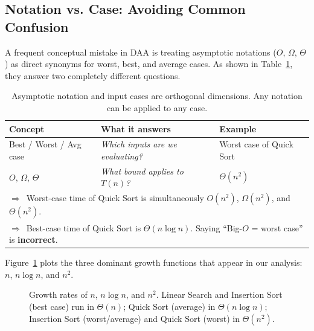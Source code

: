 \documentclass[11pt,a4paper]{article}
\begin{document}
\subsection{Notation vs. Case: Avoiding Common Confusion}
A frequent conceptual mistake in DAA is treating asymptotic notations ($O$, $\Omega$,
$\Theta$) as direct synonyms for worst, best, and average cases. As shown in
Table~\ref{tab:notation}, they answer two completely different questions.

\begin{table}[h]
\centering
\begin{tabular}{@{}lll@{}}
\toprule
\textbf{Concept}         & \textbf{What it answers}              & \textbf{Example} \\
\midrule
Best / Worst / Avg case  & \emph{Which inputs are we evaluating?}& Worst case of Quick Sort \\
$O$, $\Omega$, $\Theta$  & \emph{What bound applies to $T(n)$?}  & $\Theta(n^2)$ \\
\midrule
\multicolumn{3}{l}{\footnotesize $\Rightarrow$~Worst-case time of Quick Sort is simultaneously $O(n^2)$, $\Omega(n^2)$,
and $\Theta(n^2)$.}\\
\multicolumn{3}{l}{\footnotesize $\Rightarrow$~Best-case time of Quick Sort is $\Theta(n\log n)$.
Saying ``Big-$O$ = worst case'' is \textbf{incorrect}.}\\
\bottomrule
\end{tabular}
\caption{Asymptotic notation and input cases are orthogonal dimensions. Any
notation can be applied to any case.}
\label{tab:notation}
\end{table}

Figure~\ref{fig:growth} plots the three dominant growth functions that appear in
our analysis: $n$, $n\log n$, and $n^2$.

\begin{figure}[h]
\centering
{}
\caption{Growth rates of $n$, $n\log n$, and $n^2$. Linear Search and Insertion
Sort (best case) run in $\Theta(n)$; Quick Sort (average) in $\Theta(n\log n)$;
Insertion Sort (worst/average) and Quick Sort (worst) in $\Theta(n^2)$.}
\label{fig:growth}
\end{figure}
\end{document}
